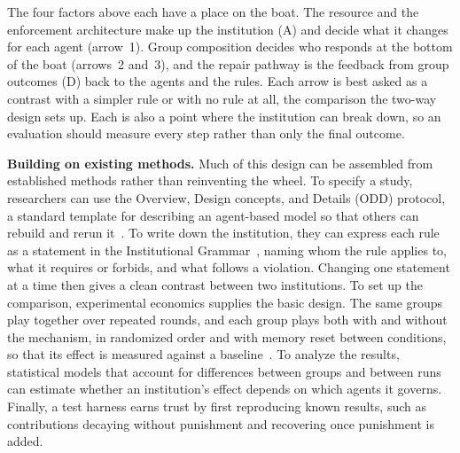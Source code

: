 \documentclass[runningheads]{llncs}
\begin{document}
The four factors above each have a place on the boat. The resource and the enforcement architecture make up the institution (A) and decide what it changes for each agent (arrow~1). Group composition decides who responds at the bottom of the boat (arrows~2 and~3), and the repair pathway is the feedback from group outcomes (D) back to the agents and the rules. Each arrow is best asked as a contrast with a simpler rule or with no rule at all, the comparison the two-way design sets up. Each is also a point where the institution can break down, so an evaluation should measure every step rather than only the final outcome.

\textbf{Building on existing methods.} Much of this design can be assembled from established methods rather than reinventing the wheel. To specify a study, researchers can use the Overview, Design concepts, and Details (ODD) protocol, a standard template for describing an agent-based model so that others can rebuild and rerun it~\mbox{\citep{grimm2020odd}}. To write down the institution, they can express each rule as a statement in the Institutional Grammar~\mbox{\citep{crawford1995grammar}}, naming whom the rule applies to, what it requires or forbids, and what follows a violation. Changing one statement at a time then gives a clean contrast between two institutions. To set up the comparison, experimental economics supplies the basic design. The same groups play together over repeated rounds, and each group plays both with and without the mechanism, in randomized order and with memory reset between conditions, so that its effect is measured against a baseline~\mbox{\citep{fehr2000cooperation}}. To analyze the results, statistical models that account for differences between groups and between runs can estimate whether an institution's effect depends on which agents it governs. Finally, a test harness earns trust by first reproducing known results, such as contributions decaying without punishment and recovering once punishment is added.
\end{document}
